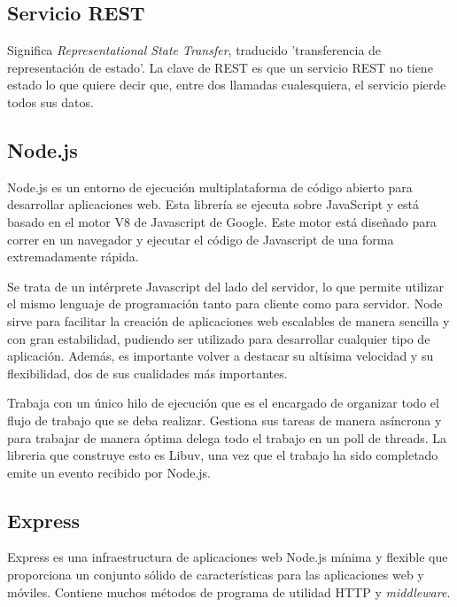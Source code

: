 \documentclass[a4paper, 12pt]{book}
\begin{document}
\subsection{Servicio REST}
\label{subsec:rest}
Significa \emph{Representational State Transfer}\cite{REST}, traducido 'transferencia de representaci\'on de estado'. La clave de REST es que un servicio REST no tiene estado lo que quiere decir que, entre dos llamadas cualesquiera, el servicio pierde todos sus datos.

\subsection{Node.js}
\label{subsec:estilo}

Node.js\cite{Node} es un entorno de ejecuci\'on multiplataforma de c\'odigo abierto para desarrollar aplicaciones
web. Esta librer\'ia se ejecuta sobre JavaScript y est\'a basado en el motor V8 de Javascript
de Google. Este motor est\'a dise\~nado para correr en un navegador y ejecutar el c\'odigo de 
Javascript de una forma extremadamente r\'apida.

Se trata de un int\'erprete Javascript del lado del servidor, lo que permite utilizar el mismo
lenguaje de programaci\'on tanto para cliente como para servidor.
Node sirve para facilitar la creaci\'on de aplicaciones web escalables de manera sencilla y con
gran estabilidad, pudiendo ser utilizado para desarrollar cualquier tipo de aplicaci\'on. Adem\'as,
es importante volver a destacar su alt\'isima velocidad y su flexibilidad, dos de sus cualidades
m\'as importantes.

Trabaja con un \'unico hilo de ejecuci\'on que es el encargado de organizar todo el flujo de
trabajo que se deba realizar. Gestiona sus tareas de manera as\'incrona y para trabajar de manera
\'optima delega todo el trabajo en un poll de threads. La libreria que construye esto es Libuv, una
vez que el trabajo ha sido completado emite un evento recibido por Node.js.



\subsection{Express}
\label{subsec:express}

Express\cite{Express} es una infraestructura de aplicaciones web Node.js m\'inima y flexible que proporciona
un conjunto s\'olido de caracter\'isticas para las aplicaciones web y m\'oviles. Contiene muchos
m\'etodos de programa de utilidad HTTP y \emph{middleware}.
\end{document}
